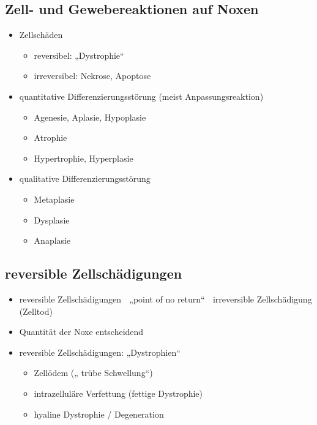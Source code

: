 \begin{it>emize}
\subsection{Zell- und Gewebereaktionen auf Noxen}
\begin{itemize}
\item Zellschäden
\begin{itemize}
\item reversibel: „Dystrophie“
\item irreversibel: Nekrose, Apoptose
\end{itemize}
\item quantitative Differenzierungsstörung (meist Anpassungsreaktion)
\begin{itemize}
\item Agenesie, Aplasie, Hypoplasie
\item Atrophie
\item Hypertrophie, Hyperplasie
\end{itemize}
\item qualitative Differenzierungsstörung
\begin{itemize}
\item Metaplasie
\item Dysplasie
\item Anaplasie
\end{itemize}
\end{itemize}

\subsection{reversible Zellschädigungen}
\begin{itemize}
\item reversible Zellschädigungen    „point of no return“    irreversible Zellschädigung (Zelltod)
\item Quantität der Noxe entscheidend
\item reversible Zellschädigungen: „Dystrophien“
\begin{itemize}
\item Zellödem („ trübe Schwellung“)
\item intrazelluläre Verfettung (fettige Dystrophie)
\item hyaline Dystrophie / Degeneration
\end{itemize}
\end{itemize}


\end{it>emize}
